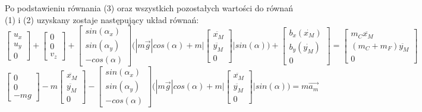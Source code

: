 \documentclass[10pt]{article}
\begin{document}
Po podstawieniu równania (3) oraz wszystkich pozostałych wartości do równań (1) i (2) uzyskany zostaje następujący układ równań:
\begin{equation}
\begin{bmatrix} u_x \\ u_y \\ 0 \end{bmatrix} + 
\begin{bmatrix} 0 \\ 0 \\ v_z \end{bmatrix} +
\begin{bmatrix} sin(\alpha_x) \\ sin(\alpha_y) \\ -cos(\alpha) \end{bmatrix}
\Bigg( |m\vec{g}|cos(\alpha) + m \Bigg| \begin{bmatrix} \ddot{x_M} \\ \ddot{y_M} \\ 0 \end{bmatrix} \Bigg| sin(\alpha) \Bigg) + 
\begin{bmatrix} b_x(\dot{x_M}) \\ b_y(\dot{y_M}) \\ 0 \end{bmatrix} = 
\begin{bmatrix} m_C \ddot{x_M} \\ (m_C + m_F) \ddot{y_M} \\ 0 \end{bmatrix}
\end{equation}
\begin{equation}
\begin{bmatrix} 0 \\ 0 \\ -mg \end{bmatrix} -
m \begin{bmatrix} \ddot{x_M} \\ \ddot{y_M} \\ 0 \end{bmatrix} - 
\begin{bmatrix} sin(\alpha_x) \\ sin(\alpha_y) \\ -cos(\alpha) \end{bmatrix}
\Bigg( |m\vec{g}|cos(\alpha) + m \Bigg| \begin{bmatrix} \ddot{x_M} \\ \ddot{y_M} \\ 0 \end{bmatrix} \Bigg| sin(\alpha) \Bigg)
 = m\vec{a_m}
\end{equation}
\end{document}
